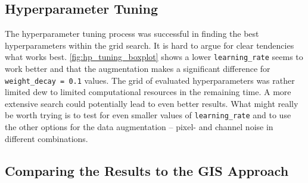 \subsection{Hyperparameter Tuning}

The hyperparameter tuning process was successful in finding the best hyperparameters
within the grid search. It is hard to argue for clear tendencies what works best.
\autoref{fig:hp_tuning_boxplot} shows a lower \texttt{learning\_rate} seems to work better and that
the augmentation makes a significant difference for \texttt{weight\_decay = 0.1} values.
The grid of evaluated hyperparameters was rather limited dew to limited computational
resources in the remaining time. A more extensive search could potentially lead to
even better results. What might really be worth trying is to test for even smaller
values of \texttt{learning\_rate} and to use the other options for the data augmentation --
pixel- and channel noise in different combinations.

\subsection{Comparing the Results to the GIS Approach}